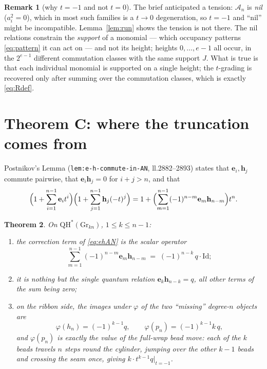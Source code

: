 \documentclass[11pt]{article}
\theoremstyle{plain}
\newtheorem{theorem}{Theorem}
\theoremstyle{definition}
\newtheorem{remark}[theorem]{Remark}
\newcommand{\A}{\mathscr{A}}
\newcommand{\QH}{\mathrm{QH}^*}
\newcommand{\Gr}{\mathrm{Gr}}
\begin{document}
\begin{remark}[why $t=-1$ and not $t=0$]
The brief anticipated a tension: $\A_n$ is \emph{nil} ($a_i^2=0$), which
in most such families is a $t\to0$ degeneration, so $t=-1$ and ``nil''
might be incompatible.  Lemma~\ref{lem:run} shows the tension is not
there.  The nil relations constrain the \emph{support} of a monomial ---
which occupancy patterns \eqref{eq:pattern} it can act on --- and not its
height; heights $0,\dots,e-1$ all occur, in the $2^{e-1}$ different
commutation classes with the same support $J$.  What is true is that each
individual monomial is supported on a single height; the $t$-grading is
recovered only after summing over the commutation classes, which is
exactly \eqref{eq:Rdef}.
\end{remark}

\section{Theorem C: where the truncation comes from}\label{sec:trunc}

Postnikov's Lemma (\texttt{lem:e-h-commute-in-AN}, ll.2882--2893) states
that $\mathbf e_i,\mathbf h_j$ commute pairwise, that
$\mathbf e_i\mathbf h_j=0$ for $i+j>n$, and that
\begin{equation}\label{eq:ehAN}
\Bigl(1+\sum_{i=1}^{n-1}\mathbf e_it^i\Bigr)
\Bigl(1+\sum_{j=1}^{n-1}\mathbf h_j(-t)^j\Bigr)
=1+\Bigl(\sum_{m=1}^{n-1}(-1)^{n-m}\mathbf e_m\mathbf h_{n-m}\Bigr)t^n .
\end{equation}

\begin{theorem}\label{thm:C}
On $\QH(\Gr_{kn})$, $1\le k\le n-1$:
\begin{enumerate}
\item[(i)] the correction term of \eqref{eq:ehAN} is the scalar operator
  \[
  \sum_{m=1}^{n-1}(-1)^{n-m}\mathbf e_m\mathbf h_{n-m}
  \;=\;(-1)^{n-k}\,q\cdot\mathrm{Id};
  \]
\item[(ii)] it is nothing but the single quantum relation
  $\mathbf e_k\mathbf h_{n-k}=q$, all other terms of the sum being zero;
\item[(iii)] on the ribbon side, the images under $\varphi$ of the two
  ``missing'' degree-$n$ objects are
  \[
  \varphi(h_n)=(-1)^{k-1}q,\qquad \varphi(p_n)=(-1)^{k-1}k\,q ,
  \]
  and $\varphi(p_n)$ is exactly the value of the \emph{full-wrap} bead
  move: each of the $k$ beads travels $n$ steps round the cylinder,
  jumping over the other $k-1$ beads and crossing the seam once, giving
  $k\cdot t^{k-1}q\big|_{t=-1}$.
\end{enumerate}
\end{theorem}
\end{document}
